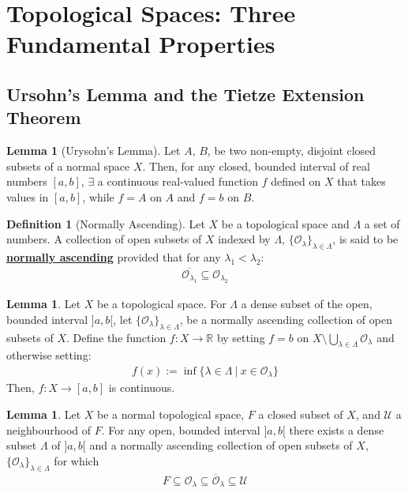 \documentclass[11pt]{article}
\newcommand{\open}[0]{\mathcal{O}}
\theoremstyle{definition}
\theoremstyle{definition}
\newcommand{\R}[0]{\mathbb{R}}
\newcommand{\dfn}[1]{\underline{\textbf{#1}}}
\newtheorem{lemma}[theorem]{Lemma}
\theoremstyle{definition}
\newtheorem{definition}{\textcolor{OliveGreen}{Definition}}
\theoremstyle{remark}
\begin{document}
\section{Topological Spaces: Three Fundamental Properties}

\subsection{Ursohn's Lemma and the Tietze Extension Theorem}
\begin{lemma}[Urysohn's Lemma]
	Let $A$, $B$, be two non-empty, disjoint closed subsets of a normal space $X$. Then, for any closed, bounded interval of real numbers $[a,b]$, $\exists$ a continuous real-valued function $f$ defined on $X$ that takes values in $[a,b]$, while $f=A$ on $A$ and $f=b$ on $B$.  
\end{lemma}

\begin{definition}[Normally Ascending]
	Let $X$ be a topological space and $\Lambda$ a set of numbers. A collection of open subsets of $X$ indexed by $\Lambda$, $\{ \open_\lambda \}_{\lambda \in \Lambda} $, is said to be \dfn{normally ascending} provided that for any $\lambda_1 < \lambda_2$: 
	\begin{align*}
		\overline{\open_{\lambda_1}} \subseteq \open_{\lambda_2} 
	\end{align*}
\end{definition}

\begin{lemma}
	Let $X$ be a topological space. For $\Lambda$ a dense subset of the open, bounded interval $]a,b[$, let $\{ \open_{\lambda}\}_{\lambda \in \Lambda}$, be a normally ascending collection of open subsets of $X$. Define the function $f: X \rightarrow \R$ by setting $f=b$ on $X \setminus \bigcup_{\lambda \in \Lambda} \open_\lambda$ and otherwise setting: 
	\begin{align}
		f(x) := \inf \{ \lambda \in \Lambda\ |\ x \in \open_\lambda \} 	
	\end{align}
	Then, $f: X \rightarrow [a,b]$ is continuous. 
\end{lemma}

\begin{lemma}
	Let $X$ be a normal topological space, $F$ a closed subset of $X$, and $\mathcal{U}$ a neighbourhood of $F$. For any open, bounded interval $]a,b[$ there exists a dense subset $\Lambda$ of $]a,b[$ and a normally ascending collection of open subsets of $X$, $\{ \open_\lambda \}_{\lambda \in \Lambda }$ for which 
	\begin{align}
		F \subseteq \open_\lambda \subseteq \overline{\open}_\lambda \subseteq \mathcal{U} 	
	\end{align}
\end{lemma}
\end{document}

